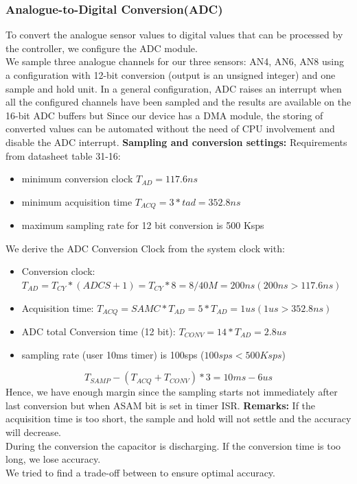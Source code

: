 \subsubsection*{Analogue-to-Digital Conversion(ADC)}

To convert the analogue sensor values to digital values that can be processed by the controller, we configure the ADC module. \\
We sample three analogue channels for our three sensors: AN4, AN6, AN8 using a configuration with 12-bit conversion (output is an unsigned integer) and one sample and hold unit.
\vskip 0.1in
\noindent
In a general configuration, ADC raises an interrupt when all the configured channels have been sampled and the results are available on the 16-bit ADC buffers but Since our device has a DMA module, the storing of converted values can be automated without the need of CPU involvement and disable the ADC interrupt.
\vskip 0.1in
\noindent
\textbf{Sampling and conversion settings:}
\vskip 0.1in
\noindent
Requirements from datasheet table 31-16:
\begin{itemize}
    \item minimum conversion clock $T_{AD} = 117.6 ns$
    \item minimum acquisition time $T_{ACQ}=3*tad= 352.8ns $
    \item maximum sampling rate for 12 bit conversion is 500 Ksps
\end{itemize}
\vskip 0.1in
\noindent
We derive the ADC Conversion Clock from the system clock with:
\begin{itemize}
    \item Conversion clock: $T_{AD}=T_{CY}*(ADCS+1)= T_{CY}*8 = 8/40M= 200ns (200ns>117.6ns)$
    \item Acquisition time: $T_{ACQ}= SAMC*T_{AD}= 5*T_{AD}=1us (1us>352.8ns)$
    \item ADC total Conversion time (12 bit): $T_{CONV}=14*T_{AD}=2.8us$
    \item sampling rate (user 10ms timer) is 100sps ($100sps < 500Ksps$)
\end{itemize}
$$T_{SAMP}-(T_{ACQ}+T_{CONV})*3=10ms-6us$$
Hence, we have enough margin since the sampling starts not immediately after last conversion but when ASAM bit is set in timer ISR.
\vskip 0.2in
\noindent
\textbf{Remarks:}
\vskip 0.1in
\noindent
If the acquisition time is too short, the sample and hold will not settle and the accuracy will decrease.\\
During the conversion the capacitor is discharging. If the conversion time is too long, we lose accuracy. \\
We tried to find a trade-off between to ensure optimal accuracy.

